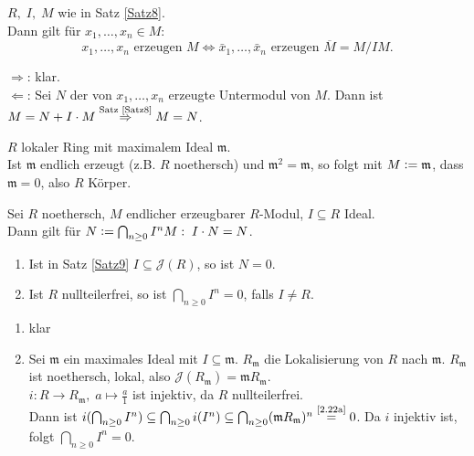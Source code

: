\documentclass[a4paper, 10pt]{report}
\begin{document}
\begin{Folg}
\label{2.21}
  $R, \; I, \; M$ wie in Satz  \ref{Satz8}.\\
  Dann gilt für $x_1, \dots, x_n \in M$:
  \[
  x_1, \dots, x_n \text{ erzeugen } M \Leftrightarrow \bar{x}_1, \dots, \bar{x}_n \text{ erzeugen } \overline{M} = M/IM.
  \]
\end{Folg}

\begin{Bew}
  \glqq$\Rightarrow$\grqq: klar.\\
  \glqq$\Leftarrow$\grqq: Sei $N$ der von $x_1, \dots, x_n$ erzeugte Untermodul von $M$. Dann ist $M = N + I \cdot M \overset{\text{\scriptsize Satz \ref{Satz8}}}{\Rightarrow} M = N$.
\end{Bew}

\begin{nnBsp}
  $R$ lokaler Ring mit maximalem Ideal $\mathfrak{m}$.\\
  Ist $\mathfrak{m}$ endlich erzeugt (z.B. $R$ noethersch) und $\mathfrak{m}^2 =
  \mathfrak{m}$, so folgt mit $M\mathrel{\mathop:}=\mathfrak{m}$, dass $\mathfrak{m}=0$,
  also $R$ Körper. 
\end{nnBsp}

\begin{Satz}
\label{Satz9}
  Sei $R$ noethersch, $M$ endlicher erzeugbarer $R$-Modul, $I \subseteq R$ Ideal.\\
  Dann gilt für $N \mathrel{\mathop:}= \bigcap_{n \geq 0} I^n M: \; I \cdot N = N$.
\end{Satz}

\begin{Folg}
\label{2.22}
  \begin{enumerate}
    \item \label{2.22a} Ist in Satz \ref{Satz9} $I \subseteq \mathcal{J}(R)$, so ist $N = 0$.
    \item Ist $R$ nullteilerfrei, so ist $\bigcap_{n \geq 0} I^n = 0$, falls $I \neq R$.
  \end{enumerate}
\end{Folg}

\begin{Bew}
  \begin{enumerate}
    \item klar
    \item Sei $\mathfrak{m}$ ein maximales Ideal mit $I \subseteq \mathfrak{m}$.
    $R_{\mathfrak{m}}$ die Lokalisierung von $R$ nach $\mathfrak{m}$.
    $R_{\mathfrak{m}}$ ist noethersch, lokal, also $\mathcal{J}(R_\mathfrak{m}) = \mathfrak{m} R_{\mathfrak{m}}$.\\
    $i: R \to R_{\mathfrak{m}}, \; a \mapsto \frac{a}{1}$ ist injektiv, da $R$ nullteilerfrei.\\
    Dann ist $i(\bigcap_{n \geq 0} I^n) \subseteq \bigcap_{n \geq 0} i(I^n)
    \subseteq \bigcap_{n \geq 0}(\mathfrak{m} R_{\mathfrak{m}})^n
    \overset{\text{\scriptsize\ref{2.22a}}}{=} 0$. Da $i$ injektiv ist, folgt
    $\bigcap_{n \geq 0} I^n = 0$.
  \end{enumerate}
\end{Bew}
\end{document}
